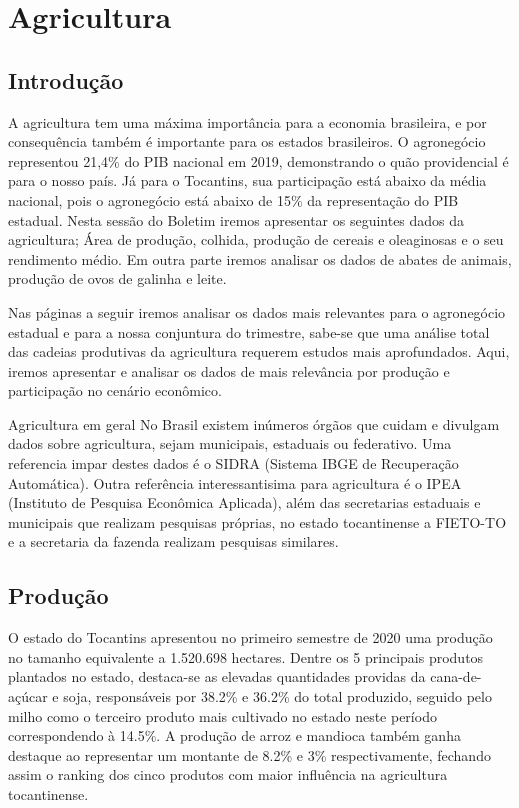 \chapter{Agricultura}
\section{Introdução}
\par A agricultura tem uma máxima importância para a economia brasileira, e por consequência também é importante para os estados brasileiros. O agronegócio representou 21,4\% do PIB nacional em 2019, demonstrando o quão providencial é para o nosso país. Já para o Tocantins, sua participação está abaixo da média nacional, pois o agronegócio está abaixo de 15\% da representação do PIB estadual. Nesta sessão do Boletim iremos apresentar os seguintes dados da agricultura; Área de produção, colhida, produção de cereais e oleaginosas e o seu rendimento médio. Em outra parte iremos analisar os dados de abates de animais, produção de ovos de galinha e leite. 
\par Nas páginas a seguir iremos analisar os dados mais relevantes para o agronegócio estadual e para a nossa conjuntura do trimestre, sabe-se que uma análise total das cadeias produtivas da agricultura requerem estudos mais aprofundados. Aqui, iremos apresentar e analisar os dados de mais relevância por produção e participação no cenário econômico.

\begin{smbox}[label={labelbox},nameref={Agricultura}]{Agricultura em geral}
No Brasil existem inúmeros órgãos que cuidam e divulgam dados sobre agricultura, sejam municipais, estaduais ou federativo. Uma referencia impar destes dados é o SIDRA (Sistema IBGE de Recuperação Automática). Outra referência interessantisima para agricultura é o IPEA (Instituto de Pesquisa Econômica Aplicada), além das secretarias estaduais e municipais que realizam pesquisas próprias, no estado tocantinense a FIETO-TO e a secretaria da fazenda realizam pesquisas similares.
\end{smbox}

\section{Produção}
\par O estado do Tocantins apresentou no primeiro semestre de 2020 uma produção no tamanho equivalente a 1.520.698 hectares. Dentre os 5 principais produtos plantados no estado, destaca-se as elevadas quantidades providas da cana-de-açúcar e soja, responsáveis por 38.2\% e 36.2\% do total produzido, seguido pelo milho como o terceiro produto mais cultivado no estado neste período correspondendo à 14.5\%. A produção de arroz e mandioca também ganha destaque ao representar um montante de 8.2\% e 3\% respectivamente, fechando assim o ranking dos cinco produtos com maior influência na agricultura tocantinense. 

